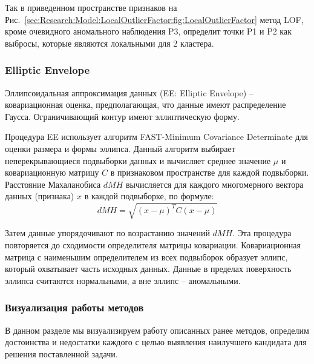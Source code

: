 \documentclass[12pt]{article}
\begin{document}
    \par Так в приведенном пространстве признаков на Рис.~\ref{sec:Research:Model:LocalOutlierFactor:fig:LocalOutlierFactor} метод LOF, кроме очевидного аномального наблюдения P3, определит точки P1 и P2 как выбросы, которые являются локальными для 2 кластера.


    \subsubsection{Elliptic Envelope}
    \label{sec:Research:Model:EllipticEnvelope}

    \par Эллипсоидальная аппроксимация данных (EE: Elliptic Envelope) -- ковариационная оценка, предполагающая, что данные имеют распределение Гаусса. Ограничивающий контур имеют эллиптическую форму.

    \par Процедура EE использует алгоритм FAST-Minimum Covariance Determinate для оценки размера и формы эллипса. Данный алгоритм выбирает неперекрывающиеся подвыборки данных и вычисляет среднее значение $\mu$ и ковариационную матрицу $C$ в признаковом пространстве для каждой подвыборки. Расстояние Махаланобиса $dMH$ вычисляется для каждого многомерного вектора данных (признака) $x$ в каждой подвыборке, по формуле:
    \begin{equation}
    \label{sec:Research:Model:EllipticEnvelope:formula:MahalanobisDistance}
        dMH = \sqrt{(x-\mu)^T C (x-\mu)}
    \end{equation}

    \noindent Затем данные упорядочивают по возрастанию значений $dMH$. Эта процедура повторяется до сходимости определителя матрицы ковариации. Ковариационная матрица с наименьшим определителем из всех подвыборок образует эллипс, который охватывает часть исходных данных. Данные в пределах поверхность эллипса считаются нормальными, а вне эллипс -- аномальными.


    \subsubsection{Визуализация работы методов}
    \label{sec:Research:Model:Visualization}

    \par В данном разделе мы визуализируем работу описанных ранее методов, определим достоинства и недостатки каждого с целью выявления наилучшего кандидата для решения поставленной задачи.
\end{document}
